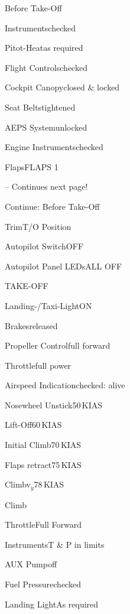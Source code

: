 \begin{checklist}{Before Take-Off}
  \item{Instruments}{checked}
  \item{Pitot-Heat}{as required}
  \item{Flight Controls}{checked}
  \item{Cockpit Canopy}{closed \& locked}
  \item{Seat Belts}{tightened}
  \item{AEPS System}{unlocked}
  \item{Engine Instruments}{checked}
  \item{Flaps}{FLAPS 1}

-- Continues next page!
\end{checklist}
\begin{checklist}{Continue: Before Take-Off}
  \item{Trim}{T/O Position}
  \item{Autopilot Switch}{OFF}
  \item{Autopilot Panel LEDs}{ALL OFF}
\end{checklist}

\begin{checklist}{TAKE-OFF}
  \item{Landing-/Taxi-Light}{ON}
  \item{Brakes}{released}
  \item{Propeller Control}{full forward}
  \item{Throttle}{full power}
  \item{Airspeed Indication}{checked: alive}
  \item{Nosewheel Unstick}{50\,KIAS}
  \item{Lift-Off}{60\,KIAS}
  \item{Initial Climb}{70\,KIAS}
  \item{Flaps retract}{75\,KIAS}
  \item{Climb}{v$_{y}$78\,KIAS} 
\end{checklist}

\begin{checklist}{Climb}
  \item{Throttle}{Full Forward}
  \item{Instruments}{T \& P in limits}
  \item{AUX Pump}{off}
  \item{Fuel Pressure}{checked}
  \item{Landing Light}{As required}
\end{checklist}

